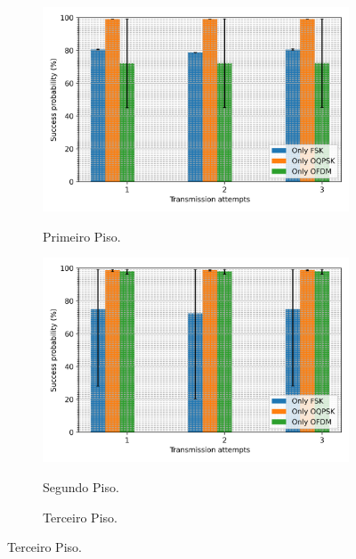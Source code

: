 \begin{figure}[ht!]
      \centering
      \begin{subfigure}{.4\textwidth}
            \centering
            \caption{Primeiro Piso.}
            \includegraphics[width=\textwidth]{./sections/textual/chapters/images/mod_1_floor.png}
            \label{fig:piso1}
      \end{subfigure}
      \begin{subfigure}{.4\textwidth}
            \centering
            \caption{Segundo Piso.}
            \includegraphics[width=\textwidth]{./sections/textual/chapters/images/mod_2_floor.png}
            \label{fig:piso2}
      \end{subfigure}
      \begin{subfigure}{.4\textwidth}
            \centering
            \caption{Terceiro Piso.}

\end{subfigure}
\end{figure}
